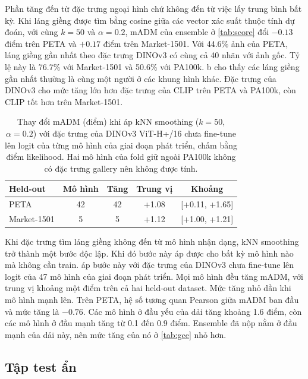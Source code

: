 \documentclass[10pt,twocolumn,letterpaper]{article}
\begin{document}
Phần tăng đến từ đặc trưng ngoại hình chứ không đến từ việc lấy trung bình bất kỳ. Khi láng giềng được tìm bằng cosine giữa các vector xác suất thuộc tính dự đoán, với cùng $k=50$ và $\alpha=0.2$, mADM của ensemble ở \cref{tab:score} đổi $-0.13$ điểm trên PETA và $+0.17$ điểm trên Market-1501. Với 44.6\% ảnh của PETA, láng giềng gần nhất theo đặc trưng DINOv3 có cùng cả 40 nhãn với ảnh gốc. Tỷ lệ này là 76.7\% với Market-1501 và 50.6\% với PA100k. b cho thấy các láng giềng gần nhất thường là cùng một người ở các khung hình khác. Đặc trưng của DINOv3 cho mức tăng lớn hơn đặc trưng của CLIP trên PETA và PA100k, còn CLIP tốt hơn trên Market-1501.

\begin{table}[t]
\centering
\small
\setlength{\tabcolsep}{3.5pt}
\begin{tabular}{@{}lcccc@{}}
\toprule
Held-out & Mô hình & Tăng & Trung vị & Khoảng \\
\midrule
PETA & 42 & 42 & +1.08 & {[}+0.11, +1.65{]} \\
Market-1501 & 5 & 5 & +1.12 & {[}+1.00, +1.21{]} \\
\bottomrule
\end{tabular}
\caption{Thay đổi mADM (điểm) khi áp kNN smoothing ($k=50$, $\alpha=0.2$) với đặc trưng của DINOv3 ViT-H+/16 chưa fine-tune lên logit của từng mô hình của giai đoạn phát triển, chấm bằng điểm likelihood. Hai mô hình của fold giữ ngoài PA100k không có đặc trưng gallery nên không được tính.}
\label{tab:knngen}
\end{table}

Khi đặc trưng tìm láng giềng không đến từ mô hình nhận dạng, kNN smoothing trở thành một bước độc lập. Khi đó bước này áp được cho bất kỳ mô hình nào mà không cần train.  áp bước này với đặc trưng của DINOv3 chưa fine-tune lên logit của 47 mô hình của giai đoạn phát triển. Mọi mô hình đều tăng mADM, với trung vị khoảng một điểm trên cả hai held-out dataset. Mức tăng nhỏ dần khi mô hình mạnh lên. Trên PETA, hệ số tương quan Pearson giữa mADM ban đầu và mức tăng là $-0.76$. Các mô hình ở đầu yếu của dải tăng khoảng 1.6 điểm, còn các mô hình ở đầu mạnh tăng từ 0.1 đến 0.9 điểm. Ensemble đã nộp nằm ở đầu mạnh của dải này, nên mức tăng của nó ở \cref{tab:gce} nhỏ hơn.

\subsection{Tập test ẩn}
\label{sec:test}
\end{document}
